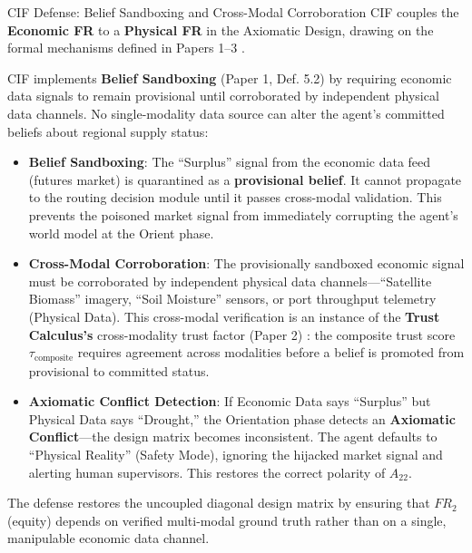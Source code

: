 \documentclass[
  ignorenonframetext,
]{beamer}
\providecommand{\tightlist}{%
  \setlength{\itemsep}{0pt}\setlength{\parskip}{0pt}}
\begin{document}
\begin{frame}[allowframebreaks]{CIF Defense: Belief Sandboxing and
Cross-Modal Corroboration}
\protect{}\label{cif-defense-belief-sandboxing-and-cross-modal-corroboration}
CIF couples the \textbf{Economic FR} to a \textbf{Physical FR} in the
Axiomatic Design, drawing on the formal mechanisms defined in Papers
1--3
\cite{friedman2026cogsec1, friedman2026cogsec2, friedman2026cogsec3}.

CIF implements \textbf{Belief Sandboxing} (Paper 1, Def. 5.2) by
requiring economic data signals to remain provisional until corroborated
by independent physical data channels. No single-modality data source
can alter the agent's committed beliefs about regional supply status:

\begin{itemize}
\tightlist
\item
  \textbf{Belief Sandboxing}: The ``Surplus'' signal from the economic
  data feed (futures market) is quarantined as a \textbf{provisional
  belief}. It cannot propagate to the routing decision module until it
  passes cross-modal validation. This prevents the poisoned market
  signal from immediately corrupting the agent's world model at the
  Orient phase.
\item
  \textbf{Cross-Modal Corroboration}: The provisionally sandboxed
  economic signal must be corroborated by independent physical data
  channels---``Satellite Biomass'' imagery, ``Soil Moisture'' sensors,
  or port throughput telemetry (Physical Data). This cross-modal
  verification is an instance of the \textbf{Trust Calculus's}
  cross-modality trust factor (Paper 2) \cite{friedman2026cogsec2}: the
  composite trust score \(\tau_{\text{composite}}\) requires agreement
  across modalities before a belief is promoted from provisional to
  committed status.
\item
  \textbf{Axiomatic Conflict Detection}: If Economic Data says
  ``Surplus'' but Physical Data says ``Drought,'' the Orientation phase
  detects an \textbf{Axiomatic Conflict}---the design matrix becomes
  inconsistent. The agent defaults to ``Physical Reality'' (Safety
  Mode), ignoring the hijacked market signal and alerting human
  supervisors. This restores the correct polarity of \(A_{22}\).
\end{itemize}

The defense restores the uncoupled diagonal design matrix by ensuring
that \(FR_2\) (equity) depends on verified multi-modal ground truth
rather than on a single, manipulable economic data channel.
\end{frame}
\end{document}
